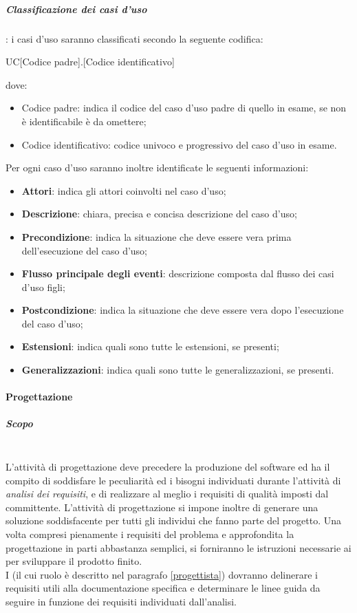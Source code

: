 \subparagraph{Classificazione dei casi d'uso}: i casi d’uso saranno classificati secondo la seguente codifica:
		\begin{center}
			UC[Codice padre].[Codice identificativo]
		\end{center}
	dove:
		\begin{itemize}
			\item Codice padre: indica il codice del caso d’uso padre di quello in esame, se non è identificabile è da omettere;
			\item Codice identificativo: codice univoco e progressivo del caso d’uso in esame.
		\end{itemize}
	Per ogni caso d’uso saranno inoltre identificate le seguenti informazioni:
		\begin{itemize}
			\item \textbf{Attori}: indica gli attori coinvolti nel caso d’uso;
			\item \textbf{Descrizione}: chiara, precisa e concisa descrizione del caso d’uso;
			\item \textbf{Precondizione}: indica la situazione che deve essere vera prima dell’esecuzione del caso d’uso;
			\item \textbf{Flusso principale degli eventi}: descrizione composta dal flusso dei casi d’uso figli;
			\item \textbf{Postcondizione}: indica la situazione che deve essere vera dopo l’esecuzione del caso d’uso;
			\item \textbf{Estensioni}: indica quali sono tutte le estensioni, se presenti;
			\item \textbf{Generalizzazioni}: indica quali sono tutte le generalizzazioni, se presenti.
		\end{itemize}
	
\paragraph{Progettazione}
\subparagraph{Scopo}
	~\\L'attività di progettazione deve precedere la produzione del software ed ha il compito di soddisfare le peculiarità ed i bisogni individuati durante l'attività di \emph{analisi dei requisiti}, e di realizzare al meglio i requisiti di qualità imposti dal committente.
	L’attività di progettazione si impone inoltre di generare una soluzione soddisfacente per tutti gli individui che fanno parte del progetto. Una volta compresi pienamente i requisiti del problema e approfondita la progettazione in parti abbastanza semplici, si forniranno le istruzioni necessarie ai \progs{} per sviluppare il prodotto finito.
	~\\I \progs{} (il cui ruolo è descritto nel paragrafo \ref{progettista}) dovranno delinerare i requisiti utili alla documentazione specifica e determinare le linee guida da seguire in funzione dei requisiti individuati dall'analisi.
	
